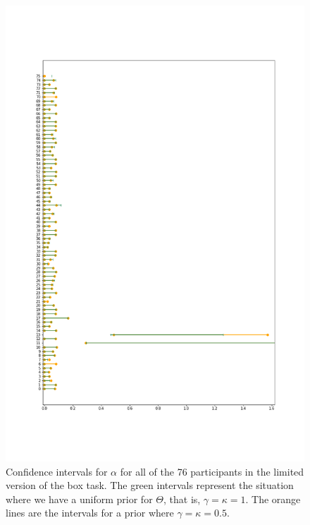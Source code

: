 \begin{figure}
    \centering
    \includegraphics[scale=0.38]{pictures/Sensitivity/ci_lim_alpha_zoom1.png}
    \caption[CIs for $\alpha$ for all participants with two different priors, limited]{Confidence intervals for $\alpha$ for all of the 76 participants in the limited version of the box task. The green intervals represent the situation where we have a uniform prior for $\Theta$, that is, $\gamma=\kappa=1$. The orange lines are the intervals for a prior where $\gamma=\kappa=0.5$.}
    \label{fig:sensitivity_ci_lim_alpha_zoom1}
\end{figure}

